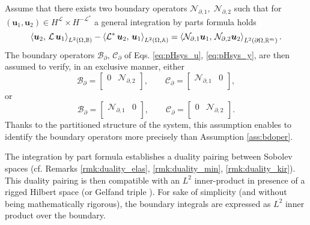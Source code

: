 \begin{assumption}
	\label{ass:operBC}
	Assume that there exists  two boundary operators $\mathcal{N}_{\partial, 1}, \; \mathcal{N}_{\partial, 2}$ such that for $(\bm{u}_1, \bm{u}_2) \in H^\mathcal{L} \times H^\mathcal{-L^*}$ a general integration by parts formula holds
	\begin{equation}\label{eq:intbypartsL} 
	\inner[L^2(\Omega, \mathbb{B})]{\bm{u}_2}{\mathcal{L}\,\bm{u}_1} - \inner[L^2(\Omega, \mathbb{A})]{\mathcal{L}^* \, \bm{u}_2}{\bm{u}_1} = \inner[L^2(\partial \Omega, \mathbb{R}^m)]{\mathcal{N}_{\partial, 1} \bm{u}_1}{\mathcal{N}_{\partial, 2} \bm{u}_2}. 
	\end{equation}
	The boundary operators $\mathcal{B}_\partial, \, \mathcal{C}_\partial$ of Eqs. \eqref{eq:pHsys_u}, \eqref{eq:pHsys_y}, are then assumed to verify, in an exclusive manner, either
	\begin{equation}\label{eq:assB2C1}
	\mathcal{B}_\partial = \begin{bmatrix}
	0 & \mathcal{N}_{\partial, 2} \\
	\end{bmatrix}, \qquad 
	\mathcal{C}_\partial = \begin{bmatrix}
	\mathcal{N}_{\partial, 1} & 0 \\
	\end{bmatrix},
	\end{equation}
	or 
	\begin{equation}\label{eq:assB1C2}
	\mathcal{B}_\partial = \begin{bmatrix}
	\mathcal{N}_{\partial, 1} & 0 \\
	\end{bmatrix}, \qquad \mathcal{C}_\partial = \begin{bmatrix}
	0 & \mathcal{N}_{\partial, 2} \\
	\end{bmatrix}.
	\end{equation}
	Thanks to the partitioned structure of the system, this assumption enables to identify the boundary operators more precisely than Assumption \ref{ass:bdoper}.
\end{assumption}

\begin{remark}
	The integration by part formula establishes a duality pairing between Sobolev spaces (cf. Remarks \ref{rmk:duality_elas}, \ref{rmk:duality_min}, \ref{rmk:duality_kir}). This duality pairing is then compatible with an $L^2$ inner-product in presence of a rigged Hilbert space (or Gelfand triple \cite{gel1964generalized}). For sake of simplicity (and without being mathematically rigorous), the boundary integrals are  expressed as $L^2$ inner product over the boundary.
\end{remark}

